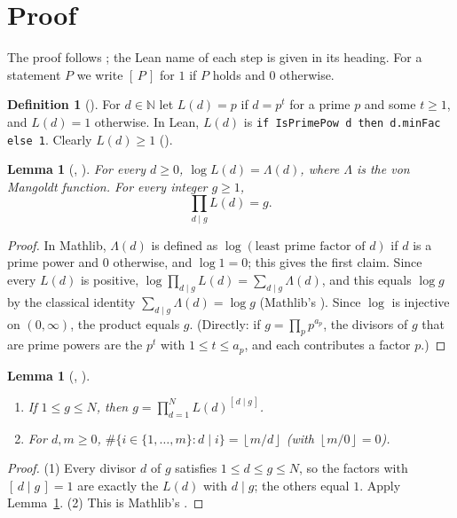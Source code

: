 \documentclass[11pt]{amsart}
\theoremstyle{plain}
\newtheorem{lemma}[theorem]{Lemma}
\theoremstyle{definition}
\newtheorem{definition}[theorem]{Definition}
\newcommand{\N}{\mathbb{N}}
\newcommand{\fl}[1]{\left\lfloor #1\right\rfloor}
\newcommand{\Ind}[1]{[\,#1\,]}
\begin{document}
\section{Proof}\label{sec:proof}

The proof follows ; the Lean name of each step is given in its heading. For a statement $P$ we write $\Ind{P}$ for $1$ if $P$ holds and $0$ otherwise.

\begin{definition}[]
For $d\in\N$ let $L(d)=p$ if $d=p^t$ for a prime $p$ and some $t\ge1$, and $L(d)=1$ otherwise. In Lean, $L(d)$ is \texttt{if IsPrimePow d then d.minFac else 1}. Clearly $L(d)\ge1$ ().
\end{definition}

\begin{lemma}[, ]\label{lem:divisors}
For every $d\ge0$, $\log L(d)=\Lambda(d)$, where $\Lambda$ is the von Mangoldt function. For every integer $g\ge1$,
\[
  \prod_{d\mid g}L(d)=g .
\]
\end{lemma}

\begin{proof}
In Mathlib, $\Lambda(d)$ is defined as $\log(\text{least prime factor of }d)$ if $d$ is a prime power and $0$ otherwise, and $\log1=0$; this gives the first claim. Since every $L(d)$ is positive, $\log\prod_{d\mid g}L(d)=\sum_{d\mid g}\Lambda(d)$, and this equals $\log g$ by the classical identity $\sum_{d\mid g}\Lambda(d)=\log g$ (Mathlib's ). Since $\log$ is injective on $(0,\infty)$, the product equals $g$.
(Directly: if $g=\prod_pp^{a_p}$, the divisors of $g$ that are prime powers are the $p^t$ with $1\le t\le a_p$, and each contributes a factor $p$.)
\end{proof}

\begin{lemma}[, ]\label{lem:decomp}
\begin{enumerate}
\item If $1\le g\le N$, then $g=\prod_{d=1}^{N}L(d)^{\Ind{d\mid g}}$.
\item For $d,m\ge0$, $\#\{i\in\{1,\dots,m\}: d\mid i\}=\fl{m/d}$ (with $\fl{m/0}=0$).
\end{enumerate}
\end{lemma}

\begin{proof}
(1) Every divisor $d$ of $g$ satisfies $1\le d\le g\le N$, so the factors with $\Ind{d\mid g}=1$ are exactly the $L(d)$ with $d\mid g$; the others equal $1$. Apply Lemma~\ref{lem:divisors}.
(2) This is Mathlib's .
\end{proof}
\end{document}

